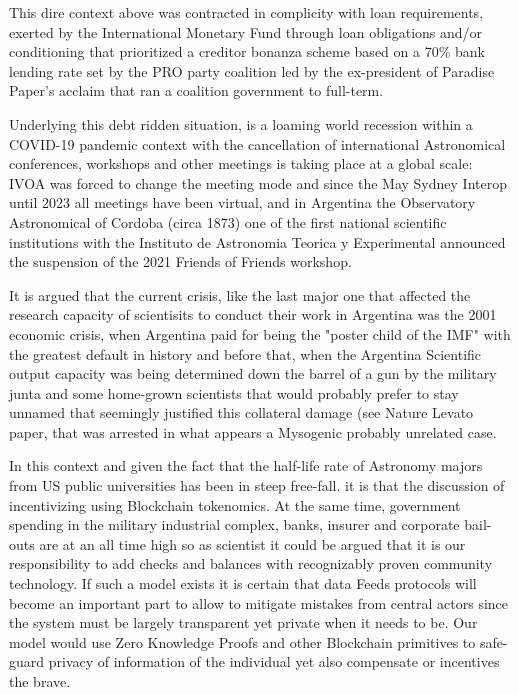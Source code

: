 \documentclass[final,5p,times,twocolumn,authoryear]{elsarticle}
\begin{document}
This dire context above was contracted in complicity with loan requirements, exerted by the International Monetary Fund through loan obligations and/or conditioning that prioritized a creditor bonanza scheme based on a 70\% bank lending rate set by the PRO party coalition led by the ex-president of Paradise Paper's acclaim that ran a coalition government to full-term. 

Underlying this debt ridden situation, is a loaming world recession within a COVID-19 pandemic context with the cancellation of international Astronomical conferences, workshops and other meetings is taking place at a global scale: IVOA was forced to change the meeting mode and since the May Sydney Interop until 2023 all meetings have been virtual, and  in Argentina the Observatory Astronomical of Cordoba (circa 1873) one of the first national scientific institutions with the Instituto de Astronomia Teorica y Experimental announced the suspension of the 2021 Friends of Friends workshop. 

It is argued that the current crisis, like the last major one that affected the research capacity of scientisits to conduct their work in Argentina was the 2001 economic crisis, when Argentina paid for being the "poster child of the IMF" with the greatest default in history and before that, when the Argentina Scientific output capacity was being determined down the barrel of a gun by the military junta and some home-grown scientists that would probably prefer to stay unnamed that seemingly justified this collateral damage (see Nature Levato paper, that was arrested in what appears a Mysogenic probably unrelated case.

In this context and given the fact that the half-life rate of Astronomy majors from US public universities has been in steep free-fall.  \cite{milo_2018} it is that the discussion of incentivizing using Blockchain tokenomics. At the same time, government spending in the military industrial complex, banks, insurer and corporate bail-outs are at an all time high so as scientist it could be argued that it is our responsibility to add checks and balances with recognizably proven community technology. 
%
If such a model exists it is certain that data Feeds protocols will become an important part to allow to mitigate mistakes from central actors since the system must be largely transparent yet private when it needs to be. Our model would use Zero Knowledge Proofs and other Blockchain primitives to safe-guard privacy of information of the individual yet also compensate or incentives the brave. 
   
\end{document}
